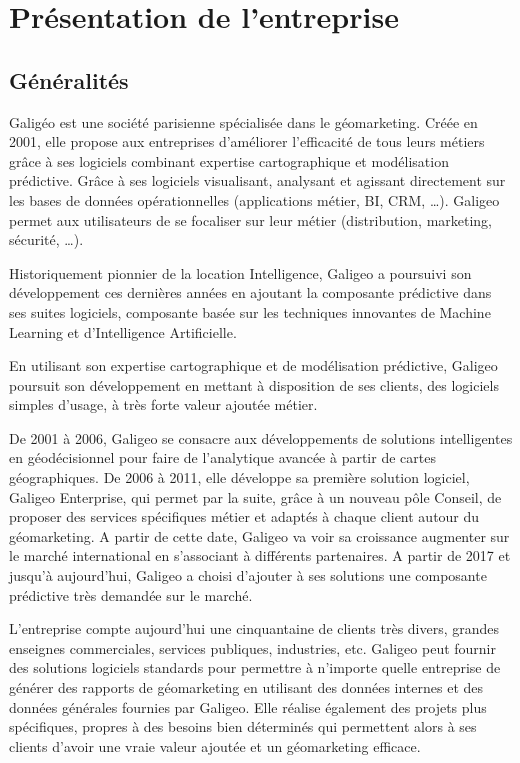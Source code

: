 
\section{Présentation de l'entreprise}

\subsection{Généralités}

Galigéo est une société parisienne spécialisée dans le géomarketing. Créée en 2001, elle propose aux entreprises d’améliorer l’efficacité de tous leurs métiers grâce à ses logiciels combinant expertise cartographique et modélisation prédictive. Grâce à ses logiciels visualisant, analysant et agissant directement sur les bases de données opérationnelles (applications métier, BI, CRM, …). Galigeo permet aux utilisateurs de se focaliser sur leur métier (distribution, marketing, sécurité, …).

Historiquement pionnier de la location Intelligence, Galigeo a poursuivi son développement ces dernières années en ajoutant la composante prédictive dans ses suites logiciels, composante basée sur les techniques innovantes de Machine Learning et d’Intelligence Artificielle.

En utilisant son expertise cartographique et de modélisation prédictive, Galigeo poursuit son développement en mettant à disposition de ses clients, des logiciels simples d’usage, à très forte valeur ajoutée métier.

De 2001 à 2006, Galigeo se consacre aux développements de solutions intelligentes en géodécisionnel pour faire de l'analytique avancée à partir de cartes géographiques. De 2006 à 2011, elle développe sa première solution logiciel, Galigeo Enterprise, qui permet par la suite, grâce à un nouveau pôle Conseil, de proposer des services spécifiques métier et adaptés à chaque client autour du géomarketing. A partir de cette date, Galigeo va voir sa croissance augmenter sur le marché international en s'associant à différents partenaires. A partir de 2017 et jusqu'à aujourd'hui, Galigeo a choisi d'ajouter à ses solutions une composante prédictive très demandée sur le marché.

L'entreprise compte aujourd'hui une cinquantaine de clients très divers, grandes enseignes commerciales, services publiques, industries, etc. Galigeo peut fournir des solutions logiciels standards pour permettre à n’importe quelle entreprise de générer des rapports de géomarketing en utilisant des données internes et des données générales fournies par Galigeo. Elle réalise également des projets plus spécifiques, propres à des besoins bien déterminés qui permettent alors à ses clients d’avoir une vraie valeur ajoutée et un géomarketing efficace.

